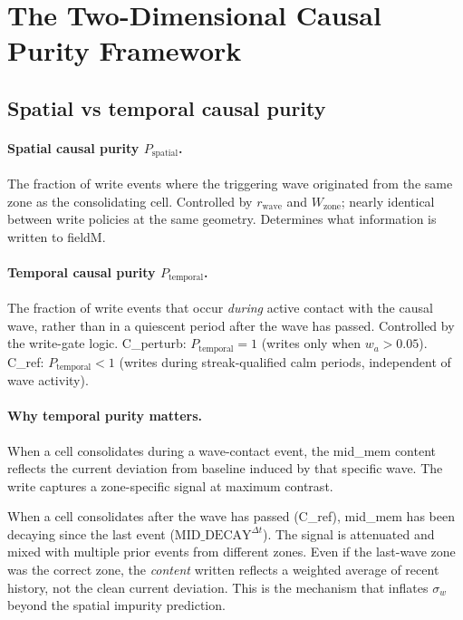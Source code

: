 \documentclass[11pt,a4paper]{article}
\newcommand{\Psp}{P_{\mathrm{spatial}}}
\newcommand{\Ptemp}{P_{\mathrm{temporal}}}
\begin{document}
\section{The Two-Dimensional Causal Purity Framework}

\subsection{Spatial vs temporal causal purity}

\paragraph{Spatial causal purity $\Psp$.}
The fraction of write events where the triggering wave originated from the same
zone as the consolidating cell.
Controlled by $r_\mathrm{wave}$ and $W_\mathrm{zone}$; nearly identical between write
policies at the same geometry.
Determines what information is written to fieldM.

\paragraph{Temporal causal purity $\Ptemp$.}
The fraction of write events that occur \emph{during} active contact with the
causal wave, rather than in a quiescent period after the wave has passed.
Controlled by the write-gate logic.
C\_perturb: $\Ptemp = 1$ (writes only when $w_a > 0.05$).
C\_ref: $\Ptemp < 1$ (writes during streak-qualified calm periods, independent of
wave activity).

\paragraph{Why temporal purity matters.}
When a cell consolidates during a wave-contact event, the mid\_mem content reflects
the current deviation from baseline induced by that specific wave.
The write captures a zone-specific signal at maximum contrast.

When a cell consolidates after the wave has passed (C\_ref), mid\_mem has been
decaying since the last event ($\mathrm{MID\_DECAY}^{\Delta t}$). The signal is
attenuated and mixed with multiple prior events from different zones.
Even if the last-wave zone was the correct zone, the \emph{content} written reflects a
weighted average of recent history, not the clean current deviation.
This is the mechanism that inflates $\sigma_w$ beyond the spatial impurity prediction.
\end{document}
